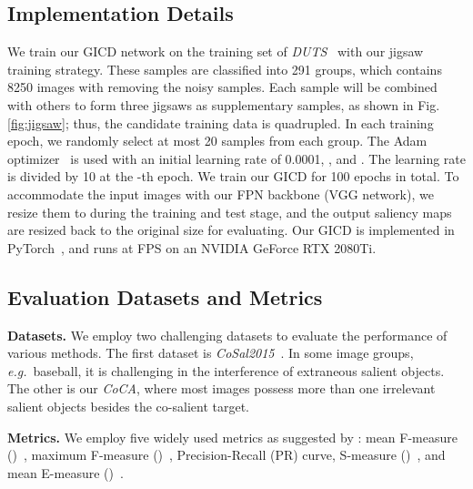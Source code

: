 \documentclass[runningheads,orivec]{llncs}
\newcommand{\figref}[1]{Fig. \ref{#1}}
\def\eg{\emph{e.g.}}
\begin{document}
\subsection{Implementation Details}
We train our GICD network on the training set of \textsl{DUTS}~\cite{wang2017} with our jigsaw training strategy.
These samples are classified into 291 groups, which contains 8250 images with removing the noisy samples. 
Each sample will be combined with others to form three jigsaws as supplementary samples, as shown in \figref{fig:jigsaw}; thus, the candidate training data is quadrupled.
In each training epoch, we randomly select at most 20 samples from each group.
The Adam optimizer~\cite{kingma2015adam} is used with an initial learning rate of 0.0001, , and .
The learning rate is divided by 10 at the -th epoch.
We train our GICD for 100 epochs in total.
To accommodate the input images with our FPN backbone (VGG network), we resize them to  during the training and test stage, and the output saliency maps are resized back to the original size for evaluating.
Our GICD is implemented in PyTorch~\cite{pytorch2019paszke}, and runs at  FPS on an NVIDIA GeForce RTX 2080Ti.


\subsection{Evaluation Datasets and Metrics}
\textbf{Datasets.}
We employ two challenging datasets to evaluate the performance of various methods.
The first dataset is \textit{CoSal2015}~\cite{zhang2016CoSal}.
In some image groups, \eg~baseball, it is challenging in the interference of extraneous salient objects.
The other is our \textit{CoCA}, where most images possess more than one irrelevant salient objects besides the co-salient target.

\noindent
\textbf{Metrics.}
We employ five widely used metrics as suggested by \cite{zhang2018review,hsu2018unsupervised,zhang2019CSMG}: mean F-measure ()~\cite{achanta2009frequency}, maximum F-measure ()~\cite{borji2015SalObjBenchmark},  Precision-Recall (PR) curve, S-measure ()~\cite{fan2017structure}, and mean E-measure ()~\cite{Fan2018Enhanced}.
\end{document}
